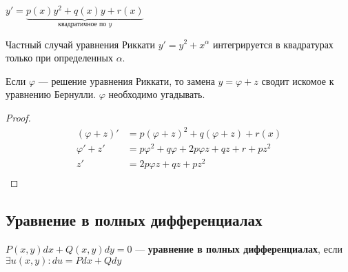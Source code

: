 \begin{definition}
    $y' = \underbrace{p(x)y^2 + q(x)y + r(x)}_{\text{квадратичное по } y}$
\end{definition}

Частный случай уравнения Риккати $y' = y^2 + x^\alpha$ интегрируется в квадратурах только при определенных $\alpha$.

Если $\varphi$ --- решение уравнения Риккати, то замена $y = \varphi + z$ сводит искомое к уравнению Бернулли. $\varphi$ необходимо угадывать.

\begin{proof}
    \begin{align*}
        (\varphi + z)' & = p(\varphi+z)^2 + q(\varphi+z) + r(x)                \\
        \varphi' + z'  & = p\varphi^2 + q\varphi + 2p\varphi z + qz + r + pz^2 \\
        z'             & = 2p\varphi z + qz + pz^2                             \\
    \end{align*}
\end{proof}

\subsection{Уравнение в полных дифференциалах}

\begin{definition}
    $P(x, y)dx + Q(x, y)dy = 0$ --- \textbf{уравнение в полных дифференциалах}, если $\exists u(x, y): du = Pdx + Qdy$
\end{definition}

